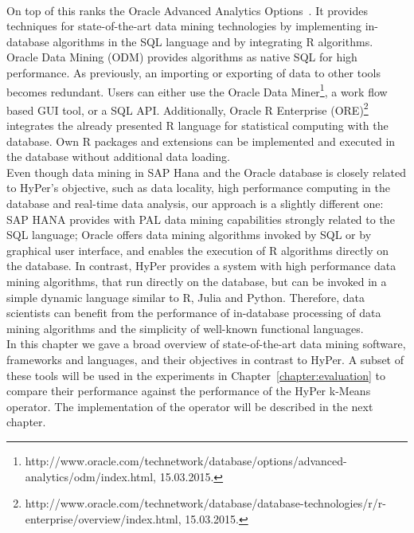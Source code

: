 \\
On top of this ranks the Oracle Advanced Analytics Options~\parencite{oracle}. It provides techniques for state-of-the-art data mining technologies by implementing in-database algorithms in the SQL language and by integrating R algorithms. Oracle Data Mining (ODM) provides algorithms as native SQL for high performance. As previously, an importing or exporting of data to other tools becomes redundant. Users can either use the Oracle Data Miner\footnote{http://www.oracle.com/technetwork/database/options/advanced-analytics/odm/index.html, 15.03.2015.}, a work flow based GUI tool, or a SQL API. Additionally, Oracle R Enterprise (ORE)\footnote{http://www.oracle.com/technetwork/database/database-technologies/r/r-enterprise/overview/index.html, 15.03.2015.} integrates the already presented R language for statistical computing with the database. Own R packages and extensions can be implemented and executed in the database without additional data loading.
\\
Even though data mining in SAP Hana and the Oracle database is closely related to HyPer's objective, such as data locality, high performance computing in the database and real-time data analysis, our approach is a slightly different one: SAP HANA provides with PAL data mining capabilities strongly related to the SQL language; Oracle offers data mining algorithms invoked by SQL or by graphical user interface, and enables the execution of R algorithms directly on the database. In contrast, HyPer provides a system with high performance data mining algorithms, that run directly on the database, but can be invoked in a simple dynamic language similar to R, Julia and Python. Therefore, data scientists can benefit from the performance of in-database processing of data mining algorithms and the simplicity of well-known functional languages.
\\
In this chapter we gave a broad overview of state-of-the-art data mining software, frameworks and languages, and their objectives in contrast to HyPer. A subset of these tools will be used in the experiments in Chapter~\ref{chapter:evaluation} to compare their performance against the performance of the HyPer k-Means operator. The implementation of the operator will be described in the next chapter.

